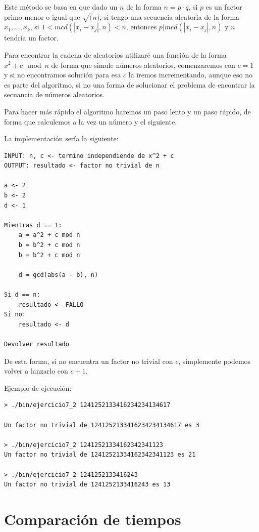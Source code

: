 \documentclass[12pt, spanish]{article}
\begin{document}
Este método se basa en que dado un $n$ de la forma $n = p \cdot q$, si $p$ es un factor primo menor o igual que $\sqrt(n)$, si tengo una secuencia aleatoria de la forma $x_1, ..., x_k$, si $1 < mcd(|x_i - x_j|, n) < n$, entonces $p | mcd(|x_i - x_j|, n)$ y $n$ tendría un factor.

Para encontrar la cadena de aleatorios utilizaré una función de la forma $x^2 + c \mod n$ de forma que simule números aleatorios, comenzaremos con $c = 1$ y si no encontramos solución para esa $c$ la iremos incrementando, aunque eso no es parte del algoritmo, si no una forma de solucionar el problema de encontrar la secuancia de números aleatorios.

Para hacer más rápido el algoritmo haremos un paso lento y un paso rápido, de forma que calculemos a la vez un número y el siguiente.

La implementación sería la siguiente:


\begin{lstlisting}[caption={Algoritmo rho de Pollard}]
INPUT: n, c <- termino independiende de x^2 + c
OUTPUT: resultado <- factor no trivial de n

a <- 2
b <- 2
d <- 1

Mientras d == 1:
	a = a^2 + c mod n
	b = b^2 + c mod n
	b = b^2 + c mod n

	d = gcd(abs(a - b), n)

Si d == n:
	resultado <- FALLO
Si no:
	resultado <- d

Devolver resultado
\end{lstlisting}

De esta forma, si no encuentra un factor no trivial con $c$, simplemente podemos volver a lanzarlo con $c + 1$.

Ejemplo de ejecución:

\begin{lstlisting}
> ./bin/ejercicio7_2 1241252133416234234134617

Un factor no trivial de 1241252133416234234134617 es 3

> ./bin/ejercicio7_2 12412521334162342341123
Un factor no trivial de 12412521334162342341123 es 21

> ./bin/ejercicio7_2 1241252133416243
Un factor no trivial de 1241252133416243 es 13
\end{lstlisting}



\section{Comparación de tiempos}


%
%
\end{document}
